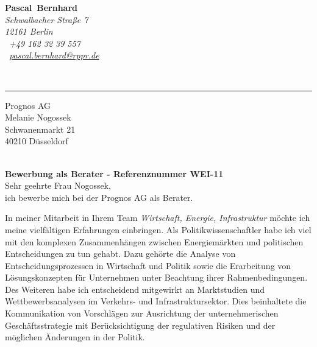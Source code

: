 \documentclass[11pt,a4paper]{article}
\def\firstname{Pascal}
\def\familyname{Bernhard}
\begin{document}
\sffamily   %
\hfill%
\begin{minipage}[t]{.6\textwidth}
	\raggedleft%
	{\bfseries {\color{firstnamecolor}\firstname}~{\color{familynamecolor}\familyname}}\\[.35ex]
	\small\itshape%
	Schwalbacher Straße 7\\
	12161 Berlin\\[.35ex]
	\Mobilefone~+49 162 32 39 557 \\
	\Letter~\href{mailto:pascal.bernhard@rppr.de}{pascal.bernhard@rppr.de}
\end{minipage}\\[0.5em]
%
{\color{firstnamecolor}\rule{\textwidth}{.25ex}}
%
\begin{minipage}[t]{.4\textwidth}
	\raggedright%
	\vspace*{1em}
	Prognos AG \\
	Melanie Nogossek\\[.35ex]
	\small%
	Schwanenmarkt 21\\
	40210 Düsseldorf
\end{minipage}
%
\hfill
%
\begin{minipage}[t]{.4\textwidth}
	\raggedleft %
\end{minipage}\\[1em]


{\bfseries \color{familynamecolor}Bewerbung als Berater - Referenznummer WEI-11}\\[0.75em]

Sehr geehrte Frau Nogossek,\\[0.5em]
%
ich bewerbe mich bei der Prognos AG als Berater.

In meiner Mitarbeit in Ihrem Team \textsl{Wirtschaft, Energie, Infrastruktur} möchte ich meine vielfältigen Erfahrungen einbringen. Als Politikwissenschaftler habe ich viel mit den komplexen Zusammen­hängen zwischen Energiemärkten und politischen Entscheidungen zu tun gehabt. Dazu gehörte die Analyse von Entscheidungsprozessen in Wirtschaft und Politik sowie die Erarbeitung von Lösungskonzepten für Unternehmen unter Beachtung ihrer Rahmenbedingungen. Des Weiteren habe ich entscheidend mitgewirkt an Marktstudien und Wettbewerbsanalysen im Verkehrs- und Infrastruktursektor. Dies beinhaltete die Kommunikation von Vorschlägen zur Ausrichtung der unter­neh­merischen Geschäfts­strategie mit Berücksichtigung der regulativen Risiken und der möglichen Änderungen in der Politik.
\end{document}

